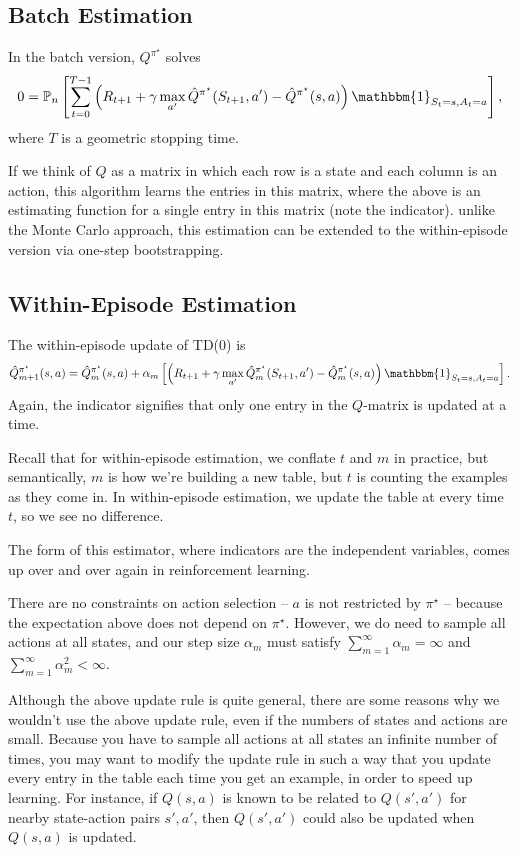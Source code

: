 \documentclass[11pt]{article}
\begin{document}
\subsection{Batch Estimation}

In the batch version, $Q^{\pi^\star}$ solves
$$0 = \mathbb{P}_n\left[\sum_{t = 0}^{T - 1}\left(R_{t + 1} + \gamma \max_{a'} \hat{Q}^{\pi^\star}(S_{t + 1}, a') - \hat{Q}^{\pi^\star}(s, a)\right)\mathbbm{1}_{S_t=s,A_t=a}\right],$$
where $T$ is a geometric stopping time.

If we think of $Q$ as a matrix in which each row is a state and each column is an action, this algorithm learns the entries in this matrix, where the above is an estimating function for a single entry in this matrix (note the indicator). unlike the Monte Carlo approach, this estimation can be extended to the within-episode version via one-step bootstrapping.

\subsection{Within-Episode Estimation}

The within-episode update of TD(0) is
$$\hat{Q}^{\pi^\star}_{m + 1}(s, a) = \hat{Q}^{\pi^\star}_{m}(s, a) + \alpha_m \left[\left(R_{t+1} + \gamma \max_{a'} \hat{Q}^{\pi^\star}_{m}(S_{t+1}, a') - \hat{Q}^{\pi^\star}_{m}(s, a)\right)\mathbbm{1}_{S_t=s,A_t=a}\right].$$
Again, the indicator signifies that only one entry in the $Q$-matrix is updated at a time.

Recall that for within-episode estimation, we conflate $t$ and $m$ in practice, but semantically, $m$ is how we're building a new table, but $t$ is counting the examples as they come in. In within-episode estimation, we update the table at every time $t$, so we see no difference.

The form of this estimator, where indicators are the independent variables, comes up over and over again in reinforcement learning.

There are no constraints on action selection -- $a$ is not restricted by $\pi^\star$ -- because the expectation above does not depend on $\pi^\star$. However, we do need to sample all actions at all states, and our step size $\alpha_m$ must satisfy $\sum_{m = 1}^\infty \alpha_m = \infty$ and $\sum_{m = 1}^\infty \alpha_m^2 < \infty$.

Although the above update rule is quite general, there are some reasons why we wouldn't use the above update rule, even if the numbers of states and actions are small. Because you have to sample all actions at all states an infinite number of times, you may want to modify the update rule in such a way that you update every entry in the table each time you get an example, in order to speed up learning. For instance, if $Q(s, a)$ is known to be related to $Q(s', a')$ for nearby state-action pairs $s', a'$, then $Q(s', a')$ could also be updated when $Q(s, a)$ is updated. 
\end{document}
